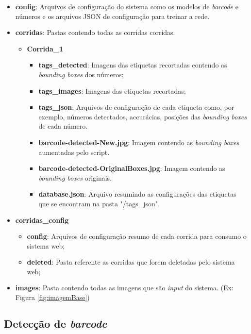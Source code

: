 \begin{itemize}
    \item \textbf{config}: Arquivos de configuração do sistema como os modelos de \textit{barcode} e números e os arquivos JSON de configuração para treinar a rede.
    \item \textbf{corridas}: Pastas contendo todas as corridas corridas.
    \begin{itemize}
        \item \textbf{Corrida\_1}
            \begin{itemize}
                \item \textbf{tags\_detected}: Imagens das etiquetas recortadas contendo as \textit{bounding boxes} dos números;
                \item \textbf{tags\_images}: Imagens das etiquetas recortadas;
                \item \textbf{tags\_json}: Arquivos  de configuração de cada etiqueta como, por exemplo, números detectados, accurácias, posições das \textit{bounding boxes} de cada número.
                \item \textbf{barcode-detected-New.jpg}: Imagem contendo as \textit{bounding boxes} aumentadas pelo script.
                \item \textbf{barcode-detected-OriginalBoxes.jpg}: Imagem contendo as \textit{bounding boxes} originais.
                \item \textbf{database.json}: Arquivo resumindo as configurações das etiquetas que se encontram na pasta "/tags\_json".
            \end{itemize}
    \end{itemize}
     \item \textbf{corridas\_config}
        \begin{itemize}
            \item \textbf{config}: Arquivos de configuração resumo de cada corrida para consumo o sistema web;
            \item \textbf{deleted}: Pasta referente as corridas que forem deletadas pelo sistema web;
        \end{itemize}
    \item \textbf{images}: Pasta contendo todas as imagens que são \textit{input} do sistema. (Ex: Figura \ref{fig:imagemBase})
\end{itemize}



\subsection{Detecção de \textit{barcode}}

